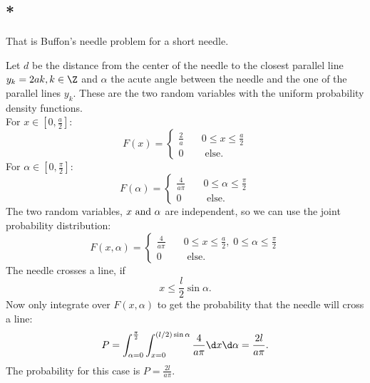 \subsection{*}
That is Buffon's needle problem for a short needle.
\begin{solution} %
	Let $d$ be the distance from the center of the needle to the closest parallel line $y_k = 2ak,k \in \Z$ and $\alpha$ the acute angle between the needle and the one of the parallel lines $y_k$. These are the two random variables with the uniform probability density functions.\\
	For $x\in [0,\frac{a}{2}]$:
	\[
		F(x) = \begin{cases}
		\frac{2}{a} \quad& 0 \le x \le \frac{a}{2}\\
		0 \quad & \text{ else}.
		\end{cases}
	\]
	For $\alpha \in [0,\frac{\pi}{2}]$:
	\[
		F(\alpha) = \begin{cases}
		\frac{4}{a\pi} \quad& 0 \le \alpha \le \frac{\pi}{2}\\
		0 \quad & \text{ else}.
		\end{cases}
	\]
	The two random variables, $x \text{ and } \alpha$ are independent, so we can use the joint probability distribution:
	\[
		F(x,\alpha) = \begin{cases}
			\frac{4}{a\pi} \quad & 0 \le x \le \frac{a}{2},\;0\le \alpha \le \frac{\pi}{2}\\
			0 \quad & \text{ else}.
		\end{cases}
	\]
	The needle crosses a line, if
	\[
		x \le \frac{l}{2} \sin \alpha.
	\]
	Now only integrate over $F(x,\alpha)$ to get the probability that the needle will cross a line:
	\[
		P = \int_{\alpha = 0}^{\frac{\pi}{2}}\int_{x=0}^{(l/2)\sin \alpha} \frac{4}{a \pi} \d x \d \alpha = \frac{2l}{a \pi}.
	\] 
	The probability for this case is $P = \frac{2l}{a \pi}$.
\end{solution}